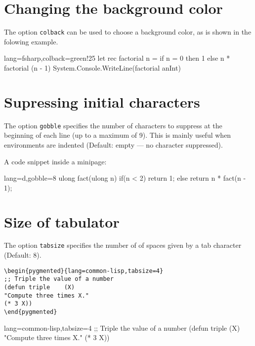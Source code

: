 \documentclass[10pt,a4paper]{article}
\begin{document}
\section{Changing the background color}

The option \verb|colback| can be used to choose a background color, as
is shown in the folowing example.

\begin{Example}
\begin{pygmented}{lang=fsharp,colback=green!25}
let rec factorial n =
if n = 0
then 1
else n * factorial (n - 1)
System.Console.WriteLine(factorial anInt)
\end{pygmented}
\end{Example}


\section{Supressing initial characters}

The option \verb|gobble| specifies the number of characters to suppress
at the beginning of each line (up to a maximum of 9). This is mainly
useful when environments are indented (Default: empty — no character
suppressed).

\begin{Example}
A code snippet inside a minipage:
\begin{minipage}{t.5\linewidth}
\begin{pygmented}{lang=d,gobble=8}
ulong fact(ulong n)
{
if(n < 2)
return 1;
else
return n * fact(n - 1);
}
\end{pygmented}
\end{minipage}
\end{Example}


\section{Size of tabulator}

The option \verb|tabsize| specifies the number of of spaces given by a
tab character (Default: 8).

\begin{Verbatim}[showtabs,tabsize=1]
\begin{pygmented}{lang=common-lisp,tabsize=4}
;; Triple the value of a number
(defun triple    (X)
"Compute three times X."
(* 3 X))
\end{pygmented}
\end{Verbatim}

\begin{pygmented}{lang=common-lisp,tabsize=4}
;; Triple the value of a number
(defun triple    (X)
"Compute three times X."
(* 3 X))
\end{pygmented}
\end{document}
